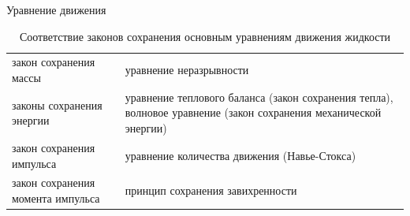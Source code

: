 \begin{chapter}{Уравнение движения}
\begin{table}
\caption{Соответствие законов сохранения основным уравнениям движения жидкости}
\label{tbl:7.1}
\begin{tabular}{p{}p{}}
\hline
закон сохранения массы    
 & уравнение неразрывности\\
законы сохранения энергии 
 & уравнение теплового баланса (закон сохранения тепла),
   волновое уравнение (закон сохранения механической энергии)\\
закон сохранения импульса
 & уравнение количества движения (Навье-Стокса)\\
закон сохранения момента импульса
 & принцип сохранения завихренности\\
\hline
\end{tabular}
\end{table}
%


\end{chapter}
